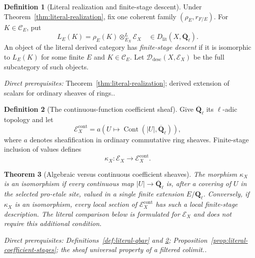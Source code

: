 \documentclass[10pt]{article}
\newtheorem{theorem}{Theorem}[section]
\theoremstyle{definition}
\newtheorem{definition}[theorem]{Definition}
\newcommand{\Ql}{\mathbf Q_\ell}
\newcommand{\Qlb}{\overline{\mathbf Q}_\ell}
\newcommand{\depends}[1]{\par\smallskip\noindent\textit{Direct prerequisites:} #1.}
\begin{document}
\begin{definition}[Literal realization and finite-stage descent]
\label{def:literal-descent}
Under Theorem~\ref{thm:literal-realization}, fix one coherent family
$(\rho_E,r_{F/E})$.  For $K\in\mathcal C_E$, put
\[
 L_E(K)=\rho_E(K)\otimes^L_{E_X}\mathcal E_X
 \quad\in D_{\mathrm{lit}}(X,\Qlb).
\]
An object of the literal derived category has \emph{finite-stage descent}
if it is isomorphic to $L_E(K)$ for some finite $E$ and
$K\in\mathcal C_E$.  Let $\mathcal D_{\mathrm{desc}}(X,\mathcal E_X)$ be
the full subcategory of such objects.
\depends{Theorem~\ref{thm:literal-realization}; derived extension of scalars
for ordinary sheaves of rings.}
\end{definition}

\begin{definition}[The continuous-function coefficient sheaf]
\label{def:continuous-qbar}
Give $\Qlb$ its $\ell$-adic topology and let
\[
 \mathcal E_X^{\mathrm{cont}}
 =a\!\left(U\longmapsto\operatorname{Cont}(|U|,\Qlb)\right),
\]
where $a$ denotes sheafification in ordinary commutative ring sheaves.
Finite-stage inclusion of values defines
\[
 \kappa_X:\mathcal E_X\longrightarrow\mathcal E_X^{\mathrm{cont}}.
\]
\end{definition}

\begin{theorem}[Algebraic versus continuous coefficient sheaves]
\label{thm:algebraic-continuous}
The morphism $\kappa_X$ is an isomorphism if every continuous map
$|U|\to\Qlb$ is, after a covering of $U$ in the selected pro-etale site,
valued in a single finite extension $E/\Ql$.  Conversely, if $\kappa_X$ is
an isomorphism, every local section of
$\mathcal E_X^{\mathrm{cont}}$ has such a local finite-stage description.
The literal comparison below is formulated for $\mathcal E_X$ and does not
require this additional condition.
\depends{Definitions~\ref{def:literal-qbar} and
\ref{def:continuous-qbar};
Proposition~\ref{prop:literal-coefficient-stages}; the sheaf universal
property of a filtered colimit.}
\end{theorem}
\end{document}
